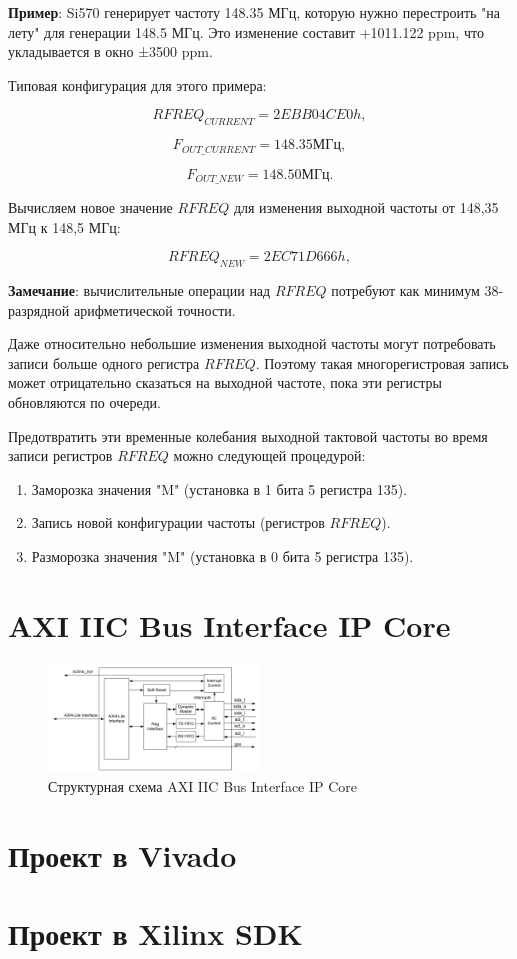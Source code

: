 \documentclass[a4paper,oneside ,14pt]{extreport}
\begin{document}
\textbf{Пример}: Si570 генерирует частоту 148.35 МГц, которую нужно перестроить "на лету" для генерации 148.5 МГц. Это изменение составит +1011.122 ppm, что укладывается в окно ±3500 ppm.

Типовая конфигурация для этого примера:

\begin{equation}	
	RFREQ_{CURRENT} =  2EBB04CE0h,
\end{equation}

\begin{equation}	
	F_{OUT\_CURRENT} =  148.35 МГц,
\end{equation}

\begin{equation}	
	F_{OUT\_NEW} = 148.50 МГц.
\end{equation}

Вычисляем новое значение \(RFREQ\) для изменения выходной частоты от 148,35 МГц к 148,5 МГц:

\begin{equation}	
	RFREQ_{NEW} = 2EC71D666h,
\end{equation}

\textbf{Замечание}: вычислительные операции над \(RFREQ\) потребуют как минимум 38-разрядной арифметической точности.

Даже относительно небольшие изменения выходной частоты могут потребовать записи больше одного регистра \(RFREQ\). Поэтому такая многорегистровая запись может отрицательно сказаться на выходной частоте, пока эти регистры обновляются по очереди.

Предотвратить эти временные колебания выходной тактовой частоты во время записи регистров \(RFREQ\) можно следующей процедурой:

\begin{enumerate}
	\item Заморозка значения "M" (установка в 1 бита 5 регистра 135). 
	\item Запись новой конфигурации частоты (регистров \(RFREQ\)).
 	\item Разморозка значения "M" (установка в 0 бита 5 регистра 135).
\end{enumerate}

\section{AXI IIC Bus Interface IP Core}
\begin{figure}[!ht]
	\centering
	\includegraphics[width=0.5\textwidth]{image/IIC_core_0.png}
	\caption{Структурная схема AXI IIC Bus Interface IP Core}
	\label{IIC_core_0.PNG}
\end{figure}


\section{Проект в Vivado}

\section{Проект в Xilinx SDK}

{}

\end{document}
